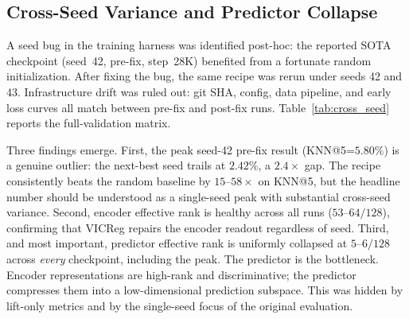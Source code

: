 \subsection{Cross-Seed Variance and Predictor Collapse}
\label{subsec:cross_seed}

A seed bug in the training harness was identified post-hoc: the
reported SOTA checkpoint (seed~42, pre-fix, step~28K) benefited from a
fortunate random initialization.  After fixing the bug, the same recipe
was rerun under seeds 42 and 43.  Infrastructure drift was ruled out:
git SHA, config, data pipeline, and early loss curves all match between
pre-fix and post-fix runs.  Table~\ref{tab:cross_seed} reports the
full-validation matrix.

\begin{table}[t]
\centering
\caption{Cross-seed full-validation matrix (N=5000).  The pre-fix
seed-42 peak ($\star$) is the checkpoint used throughout the paper.
Post-fix runs trail by $2\text{--}3\times$ on KNN@5.  Predictor
effective rank is uniformly low ($5\text{--}6/128$) across all runs,
including the peak.  Random baseline: KNN@1=$0.02\%$, KNN@5=$0.10\%$.}
\label{tab:cross_seed}
\smallskip
{}
\end{table}

Three findings emerge.  First, the peak seed-42 pre-fix result
(KNN@5=$5.80\%$) is a genuine outlier: the next-best seed trails at
$2.42\%$, a $2.4\times$ gap.  The recipe consistently beats the random
baseline by $15\text{--}58\times$ on KNN@5, but the headline number
should be understood as a single-seed peak with substantial
cross-seed variance.  Second, encoder effective rank is healthy across
all runs ($53\text{--}64/128$), confirming that VICReg repairs the
encoder readout regardless of seed.  Third, and most important,
predictor effective rank is uniformly collapsed at
$5\text{--}6/128$ across \emph{every} checkpoint, including the peak.
The predictor is the bottleneck.  Encoder representations are
high-rank and discriminative; the predictor compresses them into a
low-dimensional prediction subspace.  This was hidden by lift-only
metrics and by the single-seed focus of the original evaluation.

